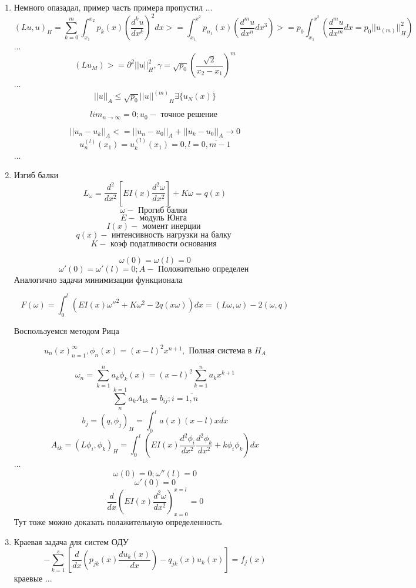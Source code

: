 \documentclass[12pt, a4paper]{article}
\begin{document}
\begin{enumerate}
	\item Немного опазадал, пример часть примера пропустил
	...
	\[ {(Lu, u)}_H = \sum_{k=0}^{m} \int_{x_1}^{x_2} p_k (x) (\frac{d^k u }{d x^k })^2 dx >= \int_{x_1}^{x^2} p_{n_1} (x) (\frac{d^m u }{d x^n } dx^3) >= p_0 \int_{x_1}^{x^2} (\frac{d^m u }{dx^m } dx = p_0 {||u_(m)||}^2_H) \]
	...
	\[ (L u_M ) >= \partial^2 {||u||}^2_H, \gamma = \sqrt{p_0} {(\frac{\sqrt{2}}{x_2-x_1})}^m \]
	...
	\[ {||u||}_A \leq \sqrt{p_0 } {||u||^{(m)}}_H \exists \{ u_N (x) \}\]

	\[ {lim}_{n \rightarrow \infty} = 0; u_0 - \textrm{ точное решение  } \]

	\[ {||u_n - u_k ||}_A <= {||u_n - u_0||}_A + {|| u_k - u_0||}_A \rightarrow 0 \]
	\[ u^{(l)}_n (x_1) = u_k^(l) (x_1) = 0, l = \overline{0, m-1} \]
	...

	\item Изгиб балки
	\[ L_{\omega} = \frac{d^2}{dx^2} [E I(x) \frac{d^2 \omega }{dx^2}] + K\omega = q(x)\]
	\[ \omega - \textrm{ Прогиб балки } \]
	\[ E - \textrm{ модуль Юнга } \]
	\[ I(x) - \textrm{ момент инерции } \]
	\[ q(x) - \textrm{ интенсивность нагрузки на балку } \]
	\[ K - \textrm{ коэф податливости основания } \]

	\[ \omega (0) = \omega (l) = 0 \]
	\[ \omega'(0) = \omega'(l) = 0 ; A - \textrm{ Положительно определен } \]
	Аналогично задачи минимизации функционала

	\[ F(\omega) = \int_{0}^{l} (E I(x) {\omega''}^2 + K\omega^2 - 2q(x \omega)) dx = (L\omega , \omega) -2 (\omega, q)\]

	Воспользуемся методом Рица

	\[ {u_n (x)}^{\infty}_{n=1}, \phi_n (x) = {(x-l)}^2 x^{n+1}, \textrm{ Полная система в  } H_A \]

	\[ \omega_n = \sum_{k=1}^{n} a_k \phi_k (x) = {(x-l)}^2 \sum_{k=1}^{n} a_k x^{k+1} \]
	\[ \sum_{n}^{k=1} a_k A_{1k} = b_{ij}; i=\overline{1, n} \]
	\[ b_j = (q, \phi_j)_H = \int_{0}^{l } a(x) (x-l) x dx \]
	\[ A_{ik} = (L \phi_i, \phi_k)_H = \int_{0}^{l} (E I(x) \frac{d^2 \phi_i}{d x^2} \frac{d^2 \phi_k}{d x^2} + k\phi_i \phi_k) dx \]
	...
	\[ \omega(0) = 0; \omega''(l) = 0 \]
	\[ \omega' (0) = 0 \]
	\[ \frac{d }{d x } (E I(x) \frac{d^2 \omega }{d x^2})^{x=l}_{x=0} = 0 \]
	Тут тоже можно доказать полажительную определенность
	
	\item Краевая задача для систем ОДУ
	\[ - \sum_{k=1}^{s} [ \frac{d }{dx }(p_{jk}(x) \frac{du_k (x)}{dx}) - q_{jk}(x) u_k (x)] = f_j(x) \]
	краевые ...


\end{enumerate}
\end{document}
